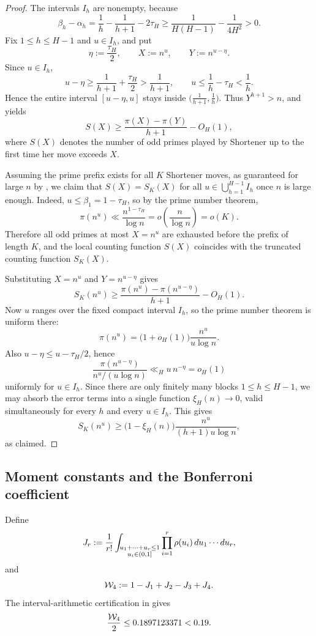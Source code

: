 \begin{proof}
The intervals $I_h$ are nonempty, because
\[
  \beta_h-\alpha_h
  =
  \frac1h-\frac1{h+1}-2\tau_H
  \ge
  \frac{1}{H(H-1)}-\frac{1}{4H^2}
  >
  0.
\]
Fix $1\le h\le H-1$ and $u\in I_h$, and put
\[
  \eta := \frac{\tau_H}{2},
  \qquad
  X := n^u,
  \qquad
  Y := n^{u-\eta}.
\]
Since $u\in I_h$,
\[
  u-\eta \ge \frac{1}{h+1}+\frac{\tau_H}{2} > \frac{1}{h+1},
  \qquad
  u \le \frac1h-\tau_H < \frac1h.
\]
Hence the entire interval $[u-\eta,u]$ stays inside
$\bigl(\frac{1}{h+1},\frac1h\bigr)$.  Thus $Y^{h+1}>n$, and
 yields
\[
  S(X)
  \ge
  \frac{\pi(X)-\pi(Y)}{h+1}-O_H(1),
\]
where $S(X)$ denotes the number of odd primes played by Shortener up to the
first time her move exceeds $X$.

Assuming the prime prefix exists for all $K$ Shortener moves, as guaranteed
for large $n$ by , we claim that $S(X)=S_K(X)$ for
all $u\in\bigcup_{h=1}^{H-1}I_h$ once $n$ is large enough.  Indeed,
$u\le \beta_1=1-\tau_H$, so by the prime number theorem,
\[
  \pi(n^u)
  \ll \frac{n^{1-\tau_H}}{\log n}
  =
  o\!\left(\frac{n}{\log n}\right)
  =
  o(K).
\]
Therefore all odd primes at most $X=n^u$ are exhausted before the prefix of
length $K$, and the local counting function $S(X)$ coincides with the truncated
counting function $S_K(X)$.

Substituting $X=n^u$ and $Y=n^{u-\eta}$ gives
\[
  S_K(n^u)
  \ge
  \frac{\pi(n^u)-\pi(n^{u-\eta})}{h+1}-O_H(1).
\]
Now $u$ ranges over the fixed compact interval $I_h$, so the prime number
theorem is uniform there:
\[
  \pi(n^u)=\bigl(1+o_H(1)\bigr)\frac{n^u}{u\log n}.
\]
Also $u-\eta\le u-\tau_H/2$, hence
\[
  \frac{\pi(n^{u-\eta})}{n^u/(u\log n)}
  \ll_H
  u\,n^{-\eta}
  =
  o_H(1)
\]
uniformly for $u\in I_h$.  Since there are only finitely many blocks
$1\le h\le H-1$, we may absorb the error terms into a single function
$\xi_H(n)\to 0$, valid simultaneously for every $h$ and every $u\in I_h$.
This gives
\[
  S_K(n^u)
  \ge
  \bigl(1-\xi_H(n)\bigr)\frac{n^u}{(h+1)u\log n},
\]
as claimed.
\end{proof}

\subsection{Moment constants and the Bonferroni coefficient}

Define
\[
  J_r
  :=
  \frac1{r!}
  \int_{\substack{u_1+\cdots+u_r\le 1\\u_i\in(0,1]}}
  \prod_{i=1}^r \rho(u_i)\,du_1\cdots du_r,
\]
and
\[
  \mathcal{W}_4 := 1-J_1+J_2-J_3+J_4.
\]
The interval-arithmetic certification in  gives
\[
  \frac{\mathcal{W}_4}{2}\le 0.1897123371<0.19.
\]

